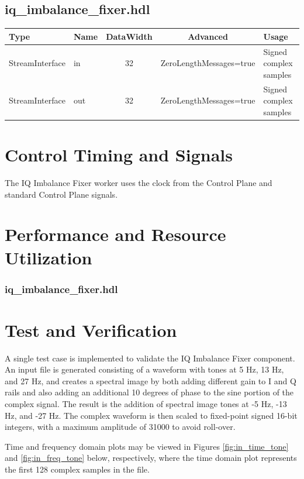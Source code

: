 \documentclass{article}
\def\comp{iq\_imbalance\_fixer}
\edef\ecomp{iq_imbalance_fixer}
\begin{document}
\begin{landscape}
		\subsection*{\comp.hdl}
		\begin{scriptsize}
			\begin{tabular}{|M{2cm}|M{1.5cm}|c|c|M{12cm}|}
				\hline
				Type            & Name & DataWidth & Advanced                & Usage                  \\
				\hline
				StreamInterface & in   & 32        & ZeroLengthMessages=true & Signed complex samples \\
				\hline
				StreamInterface & out  & 32        & ZeroLengthMessages=true & Signed complex samples \\
				\hline
			\end{tabular}
		\end{scriptsize}
	\end{landscape}

	\section*{Control Timing and Signals}
	\begin{flushleft}
		The IQ Imbalance Fixer worker uses the clock from the Control Plane and standard Control Plane signals.
	\end{flushleft}

	\section*{Performance and Resource Utilization}
	\subsubsection*{\comp.hdl}

	\section*{Test and Verification}
	\begin{flushleft}
	A single test case is implemented to validate the IQ Imbalance Fixer component. An input file is generated consisting of a waveform with tones at 5 Hz, 13 Hz, and 27 Hz, and creates a spectral image by both adding different gain to I and Q rails and also adding an additional 10 degrees of phase to the sine portion of the complex signal. The result is the addition of spectral image tones at -5 Hz, -13 Hz, and -27 Hz. The complex waveform is then scaled to fixed-point signed 16-bit integers, with a maximum amplitude of 31000 to avoid roll-over.\medskip

Time and frequency domain plots may be viewed in Figures \ref{fig:in_time_tone} and \ref{fig:in_freq_tone} below, respectively, where the time domain plot represents the first 128 complex samples in the file.
	\end{flushleft}
\end{document}
